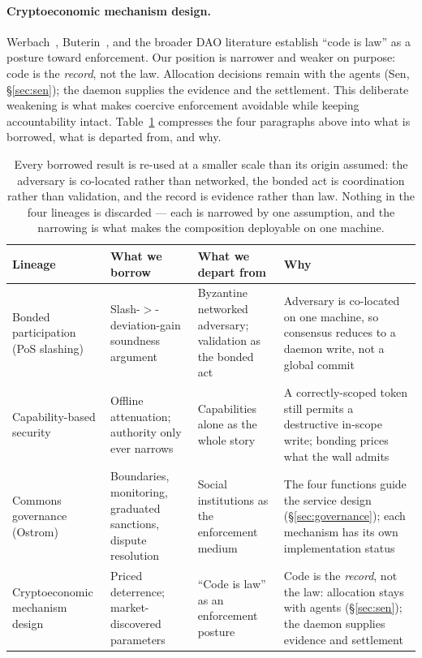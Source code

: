 \documentclass[11pt,a4paper]{article}
\theoremstyle{definition}
\theoremstyle{remark}
\begin{document}
\paragraph{Cryptoeconomic mechanism design.} Werbach~, Buterin~, and the broader DAO literature establish ``code is law'' as a posture toward enforcement. Our position is narrower and weaker on purpose: code is the \emph{record}, not the law. Allocation decisions remain with the agents (Sen, \S\ref{sec:sen}); the daemon supplies the evidence and the settlement. This deliberate weakening is what makes coercive enforcement avoidable while keeping accountability intact.
Table~\ref{tab:related-borrow} compresses the four paragraphs above into what is borrowed, what is departed from, and why.
\begin{table}[H]
\centering
\caption{Every borrowed result is re-used at a smaller scale than its origin assumed: the adversary is co-located rather than networked, the bonded act is coordination rather than validation, and the record is evidence rather than law. Nothing in the four lineages is discarded --- each is narrowed by one assumption, and the narrowing is what makes the composition deployable on one machine.}
\label{tab:related-borrow}
\small
\setlength{\tabcolsep}{2pt}
\begin{tabularx}{\textwidth}{@{}>{\raggedright\arraybackslash}p{} >{\raggedright\arraybackslash}X >{\raggedright\arraybackslash}X >{\raggedright\arraybackslash}X@{}}
\toprule
\textbf{Lineage} & \textbf{What we borrow} & \textbf{What we depart from} & \textbf{Why} \\
\midrule
Bonded participation (PoS slashing) & Slash-$>$-deviation-gain soundness argument & Byzantine networked adversary; validation as the bonded act & Adversary is co-located on one machine, so consensus reduces to a daemon write, not a global commit \\
Capability-based security & Offline attenuation; authority only ever narrows & Capabilities alone as the whole story & A correctly-scoped token still permits a destructive in-scope write; bonding prices what the wall admits \\
Commons governance (Ostrom) & Boundaries, monitoring, graduated sanctions, dispute resolution & Social institutions as the enforcement medium & The four functions guide the service design (\S\ref{sec:governance}); each mechanism has its own implementation status \\
Cryptoeconomic mechanism design & Priced deterrence; market-discovered parameters & ``Code is law'' as an enforcement posture & Code is the \emph{record}, not the law: allocation stays with agents (\S\ref{sec:sen}); the daemon supplies evidence and settlement \\
\bottomrule
\end{tabularx}
\end{table}
\end{document}
